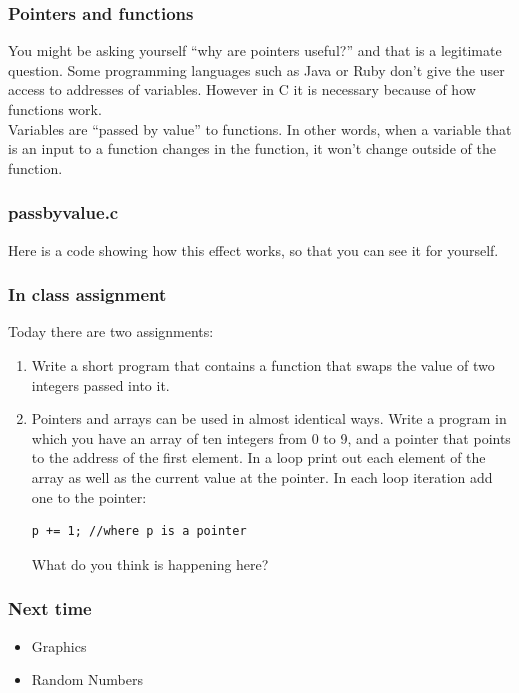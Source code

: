 \documentclass{beamer}
\begin{document}
\begin{frame}[fragile]
  \frametitle{Pointers and functions}
  You might be asking yourself ``why are pointers useful?'' and that
  is a legitimate question. Some programming languages such as Java
  or Ruby don't give the user access to addresses of variables.
  However in C it is necessary because of how functions work.\\
  \vspace{12pt}
  Variables are ``passed by value'' to functions. In other words,
  when a variable that is an input to a function changes in the
  function, it won't change outside of the function.
\end{frame}

\begin{frame}
  \frametitle{passbyvalue.c}
  Here is a code showing how this effect works, so that you can see
  it for yourself.
  
\end{frame}

\begin{frame}[fragile]
  \frametitle{In class assignment}
  Today there are two assignments:
  \begin{enumerate}
  \item Write a short program that contains a function that swaps the value
    of two integers passed into it.
  \item Pointers and arrays can be used in almost identical ways. 
    Write a program in which you have an array of ten integers from 0 to 9,
    and a pointer that points to the address of the first element.
    In a loop print out each element of the array as well as the current
    value at the pointer. In each loop iteration add one to the pointer:
    \begin{lstlisting}[style=customc]
      p += 1; //where p is a pointer
    \end{lstlisting}
    What do you think is happening here?
  \end{enumerate}
\end{frame}

\begin{frame}
  \frametitle{Next time}
  \begin{itemize}
    \item Graphics
    \item Random Numbers
  \end{itemize}
\end{frame}
\end{document}
